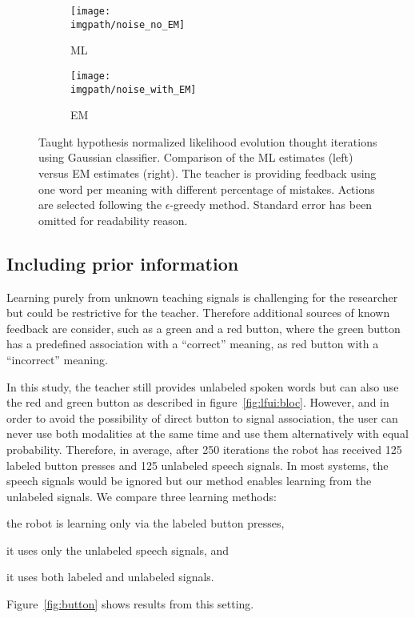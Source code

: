 \begin{figure}[!htbp]
  \centering
  \begin{subfigure}[b]{0.49\columnwidth}
    \centering
    \texttt{[image: \\imgpath/noise\_no\_EM]}
    \caption{ML}
  \end{subfigure}
  \begin{subfigure}[b]{0.49\columnwidth}
    \centering
    \texttt{[image: \\imgpath/noise\_with\_EM]}
    \caption{EM}
  \end{subfigure}
  \caption{Taught hypothesis normalized likelihood evolution thought iterations using Gaussian classifier. Comparison of the ML estimates (left) versus EM estimates (right). The teacher is providing feedback using one word per meaning with different percentage of mistakes. Actions are selected following the $\epsilon$-greedy method. Standard error has been omitted for readability reason.}
  \label{fig:Noise}
\end{figure}

\subsection{Including prior information}
\label{sec:IncludingPriorInformation}

Learning purely from unknown teaching signals is challenging for the researcher but could be restrictive for the teacher. Therefore additional sources of known feedback are consider, such as a green and a red button, where the green button has a predefined association with a ``correct'' meaning, as red button with a ``incorrect'' meaning. 


In this study, the teacher still provides unlabeled spoken words but can also use the red and green button as described in figure~\ref{fig:lfui:bloc}. However, and in order to avoid the possibility of direct button to signal association, the user can never use both modalities at the same time and use them alternatively with equal probability. Therefore, in average, after 250 iterations the robot has received 125 labeled button presses and 125 unlabeled speech signals. In most systems, the speech signals would be ignored but our method enables learning from the unlabeled signals. We compare three learning methods: \begin{inparaenum}[(1)] \item the robot is learning only via the labeled button presses, \item it uses only the unlabeled speech signals, and \item it uses both labeled and unlabeled signals. \end{inparaenum} Figure~\ref{fig:button} shows results from this setting. 

